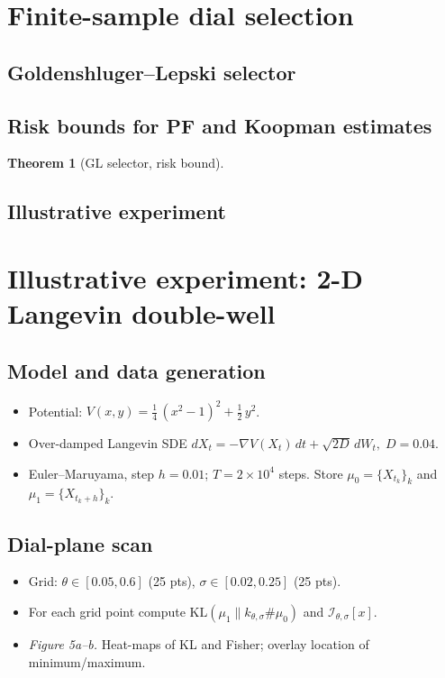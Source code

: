 \documentclass{article}
\theoremstyle{plain}
\newtheorem{theorem}{Theorem}[section]
\theoremstyle{definition}
\theoremstyle{remark}
\begin{document}
\section{Finite-sample dial selection}
 	\subsection{Goldenshluger–Lepski selector}
 	 \subsection{Risk bounds for PF and Koopman estimates}
  
  		\begin{theorem}[GL selector, risk bound]\label{thm:GL}
		\end{theorem}
	
 	 \subsection{Illustrative experiment}

\section{Illustrative experiment: 2-D Langevin double-well}
	\subsection{Model and data generation}
		\begin{itemize}[nosep,leftmargin=*]
 			 \item Potential:
			 	 \(V(x,y)=\tfrac14\,(x^{2}-1)^{2}+\tfrac12\,y^{2}\).
			
			\item Over-damped Langevin SDE  \(dX_t=-\nabla V(X_t)\,dt+\sqrt{2D}\,dW_t,\;D=0.04\).
			
			\item Euler–Maruyama, step \(h=0.01\); $T=2\times10^{4}$ steps. Store \(\mu_0=\{X_{t_k}\}_{k}\) and \(\mu_1=\{X_{t_k+h}\}_{k}\).
		\end{itemize}

	\subsection{Dial-plane scan}
	
		\begin{itemize}[nosep,leftmargin=*]
 			 \item Grid: $\theta\in[0.05,0.6]$ (25 pts), $\sigma\in[0.02,0.25]$ (25 pts).
			 
			 \item For each grid point compute  
			 	$\mathrm{KL}(\mu_1\parallel k_{\theta,\sigma}\!\#\mu_0)$ and $\mathcal I_{\theta,\sigma}[x]$.
				
			\item \emph{Figure 5a–b.}  Heat-maps of KL and Fisher; overlay location of minimum/maximum.
		\end{itemize}
\end{document}
